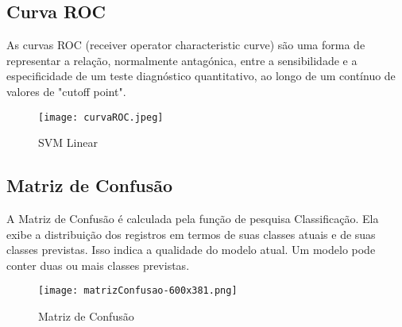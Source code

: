 \subsection{Curva ROC}
As curvas ROC (receiver operator characteristic curve) são uma forma de representar a relação, 
normalmente antagónica, entre a sensibilidade e a especificidade 
de um teste diagnóstico quantitativo, ao longo de um contínuo de valores de "cutoff point".

\begin{figure}[!h]
    \centering
    \texttt{[image: curvaROC.jpeg]}
    \caption{SVM Linear}
\end{figure}


\subsection{Matriz de Confusão}
A Matriz de Confusão é calculada pela função de pesquisa Classificação. 
Ela exibe a distribuição dos registros em termos de suas classes atuais e de suas classes previstas. 
Isso indica a qualidade do modelo atual. Um modelo pode conter duas ou mais classes previstas.

\begin{figure}[!h]
    \centering
    \texttt{[image: matrizConfusao-600x381.png]}
    \caption{Matriz de Confusão}
\end{figure}